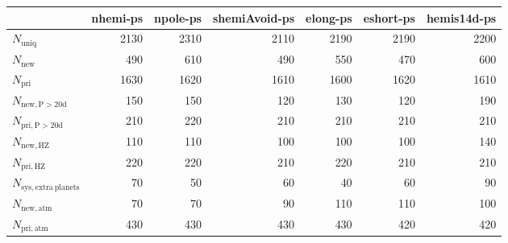 \begin{tabular}{lrrrrrr}
\toprule
{} &  nhemi-ps &  npole-ps &  shemiAvoid-ps &  elong-ps &  eshort-ps &  hemis14d-ps \\
\midrule
$N_{\mathrm{uniq}}$               &      2130 &      2310 &           2110 &      2190 &       2190 &         2200 \\
$N_{\mathrm{new}}$                &       490 &       610 &            490 &       550 &        470 &          600 \\
$N_{\mathrm{pri}}$                &      1630 &      1620 &           1610 &      1600 &       1620 &         1610 \\
$N_{\mathrm{new,P>20d}}$          &       150 &       150 &            120 &       130 &        120 &          190 \\
$N_{\mathrm{pri,P>20d}}$          &       210 &       220 &            210 &       210 &        210 &          210 \\
$N_{\mathrm{new,HZ}}$             &       110 &       110 &            100 &       100 &        100 &          140 \\
$N_{\mathrm{pri,HZ}}$             &       220 &       220 &            210 &       220 &        210 &          210 \\
$N_{\mathrm{sys,extra\ planets}}$ &        70 &        50 &             60 &        40 &         60 &           90 \\
$N_{\mathrm{new,atm}}$            &        70 &        70 &             90 &       110 &        110 &          100 \\
$N_{\mathrm{pri,atm}}$            &       430 &       430 &            430 &       430 &        420 &          420 \\
\bottomrule
\end{tabular}
